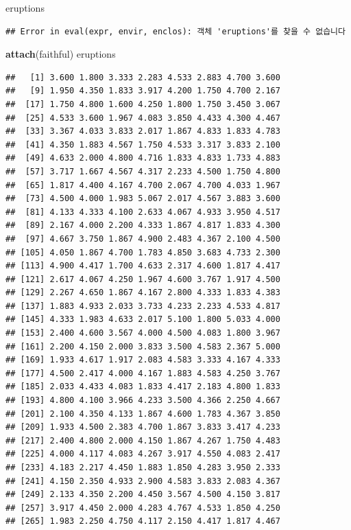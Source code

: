 \documentclass[10pt,]{krantz}
\makeatletter
\newenvironment{Shaded}{\begin{snugshade}}{\end{snugshade}}
\newcommand{\KeywordTok}[1]{\textcolor[rgb]{0.13,0.29,0.53}{\textbf{#1}}}
\newcommand{\NormalTok}[1]{#1}
\newenvironment{kframe}{%
\medskip{}
\setlength{\fboxsep}{.8em}
 \def\at@end@of@kframe{}%
 \ifinner\ifhmode%
  \def\at@end@of@kframe{\end{minipage}}%
  \begin{minipage}{\columnwidth}%
 \fi\fi%
 \def\FrameCommand##1{\hskip\@totalleftmargin \hskip-\fboxsep
 \colorbox{shadecolor}{##1}\hskip-\fboxsep
     \hskip-\linewidth \hskip-\@totalleftmargin \hskip\columnwidth}%
 \MakeFramed {\advance\hsize-\width
   \@totalleftmargin\z@ \linewidth\hsize
   \@setminipage}}%
 {\par\unskip\endMakeFramed%
 \at@end@of@kframe}
\renewenvironment{Shaded}{\begin{kframe}}{\end{kframe}}
\makeatother
\begin{document}
\begin{Shaded}
\begin{Highlighting}[]
\NormalTok{eruptions}
\end{Highlighting}
\end{Shaded}

\begin{verbatim}
## Error in eval(expr, envir, enclos): 객체 'eruptions'를 찾을 수 없습니다
\end{verbatim}

\begin{Shaded}
\begin{Highlighting}[]
\KeywordTok{attach}\NormalTok{(faithful)}
\NormalTok{eruptions}
\end{Highlighting}
\end{Shaded}

\begin{verbatim}
##   [1] 3.600 1.800 3.333 2.283 4.533 2.883 4.700 3.600
##   [9] 1.950 4.350 1.833 3.917 4.200 1.750 4.700 2.167
##  [17] 1.750 4.800 1.600 4.250 1.800 1.750 3.450 3.067
##  [25] 4.533 3.600 1.967 4.083 3.850 4.433 4.300 4.467
##  [33] 3.367 4.033 3.833 2.017 1.867 4.833 1.833 4.783
##  [41] 4.350 1.883 4.567 1.750 4.533 3.317 3.833 2.100
##  [49] 4.633 2.000 4.800 4.716 1.833 4.833 1.733 4.883
##  [57] 3.717 1.667 4.567 4.317 2.233 4.500 1.750 4.800
##  [65] 1.817 4.400 4.167 4.700 2.067 4.700 4.033 1.967
##  [73] 4.500 4.000 1.983 5.067 2.017 4.567 3.883 3.600
##  [81] 4.133 4.333 4.100 2.633 4.067 4.933 3.950 4.517
##  [89] 2.167 4.000 2.200 4.333 1.867 4.817 1.833 4.300
##  [97] 4.667 3.750 1.867 4.900 2.483 4.367 2.100 4.500
## [105] 4.050 1.867 4.700 1.783 4.850 3.683 4.733 2.300
## [113] 4.900 4.417 1.700 4.633 2.317 4.600 1.817 4.417
## [121] 2.617 4.067 4.250 1.967 4.600 3.767 1.917 4.500
## [129] 2.267 4.650 1.867 4.167 2.800 4.333 1.833 4.383
## [137] 1.883 4.933 2.033 3.733 4.233 2.233 4.533 4.817
## [145] 4.333 1.983 4.633 2.017 5.100 1.800 5.033 4.000
## [153] 2.400 4.600 3.567 4.000 4.500 4.083 1.800 3.967
## [161] 2.200 4.150 2.000 3.833 3.500 4.583 2.367 5.000
## [169] 1.933 4.617 1.917 2.083 4.583 3.333 4.167 4.333
## [177] 4.500 2.417 4.000 4.167 1.883 4.583 4.250 3.767
## [185] 2.033 4.433 4.083 1.833 4.417 2.183 4.800 1.833
## [193] 4.800 4.100 3.966 4.233 3.500 4.366 2.250 4.667
## [201] 2.100 4.350 4.133 1.867 4.600 1.783 4.367 3.850
## [209] 1.933 4.500 2.383 4.700 1.867 3.833 3.417 4.233
## [217] 2.400 4.800 2.000 4.150 1.867 4.267 1.750 4.483
## [225] 4.000 4.117 4.083 4.267 3.917 4.550 4.083 2.417
## [233] 4.183 2.217 4.450 1.883 1.850 4.283 3.950 2.333
## [241] 4.150 2.350 4.933 2.900 4.583 3.833 2.083 4.367
## [249] 2.133 4.350 2.200 4.450 3.567 4.500 4.150 3.817
## [257] 3.917 4.450 2.000 4.283 4.767 4.533 1.850 4.250
## [265] 1.983 2.250 4.750 4.117 2.150 4.417 1.817 4.467
\end{verbatim}
\end{document}
